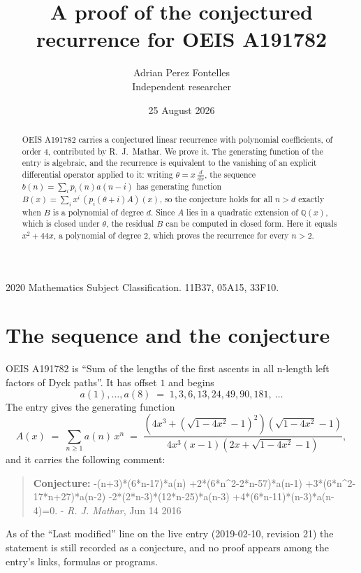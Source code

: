 \documentclass[11pt,a4paper]{article}
\title{A proof of the conjectured recurrence for OEIS A191782}
\author{Adrian Perez Fontelles\\ \small Independent researcher}
\date{25 August 2026}
\theoremstyle{plain}
\theoremstyle{definition}
\begin{document}
\maketitle

\begin{abstract}
OEIS A191782 carries a conjectured linear recurrence with polynomial coefficients, of
order 4, contributed by R.~J.~Mathar. We prove it. The generating function of the
entry is algebraic, and the recurrence is equivalent to the vanishing of an explicit
differential operator applied to it: writing $\theta=x\,\frac{d}{dx}$, the sequence
$b(n)=\sum_{i}p_{i}(n)a(n-i)$ has generating function
$B(x)=\sum_{i}x^{i}\,(p_{i}(\theta+i)A)(x)$, so the conjecture holds for all $n>d$ exactly
when $B$ is a polynomial of degree $d$. Since $A$ lies in a quadratic extension of
$\mathbb{Q}(x)$, which is closed under $\theta$, the residual $B$ can be computed in
closed form. Here it equals $x^{2} + 44 x$, a polynomial of degree $2$, which proves
the recurrence for every $n>2$.
\end{abstract}

\noindent\small 2020 Mathematics Subject Classification. 11B37, 05A15, 33F10.\normalsize

\section{The sequence and the conjecture}

OEIS A191782 is ``Sum of the lengths of the first ascents in all n-length left factors of Dyck paths''. It has offset $1$ and begins
\[
a(1),\dots,a(8)\;=\;1, 3, 6, 13, 24, 49, 90, 181,\ \dots
\]
The entry gives the generating function
\begin{equation}\label{eq:gf}
A(x)\;=\;\sum_{n\ge 1} a(n)\,x^{n}\;=\;\frac{\left(4 x^{3} + \left(\sqrt{1 - 4 x^{2}} - 1\right)^{2}\right) \left(\sqrt{1 - 4 x^{2}} - 1\right)}{4 x^{3} \left(x - 1\right) \left(2 x + \sqrt{1 - 4 x^{2}} - 1\right)} ,
\end{equation}
and it carries the following comment:
\begin{quote}\small
\textbf{Conjecture:} -(n+3)*(6*n-17)*a(n) +2*(6*n\^{}2-2*n-57)*a(n-1) +3*(6*n\^{}2-17*n+27)*a(n-2) -2*(2*n-3)*(12*n-25)*a(n-3) +4*(6*n-11)*(n-3)*a(n-4)=0. - \emph{R. J. Mathar}, Jun 14 2016
\end{quote}
As of the ``Last modified'' line on the live entry (2019-02-10, revision 21) the
statement is still recorded as a conjecture, and no proof appears among the entry's links,
formulas or programs.
\end{document}
